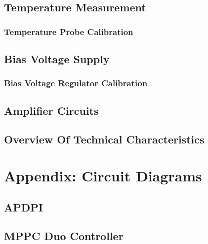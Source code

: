 \documentclass[a4paper, 12pt]{article}
\begin{document}
	\subsection{Temperature Measurement}
		\subsubsection{Temperature Probe Calibration}
	\subsection{Bias Voltage Supply}
		\subsubsection{Bias Voltage Regulator Calibration}
	\subsection{Amplifier Circuits}
	\subsection{Overview Of Technical Characteristics}

	\section{Appendix: Circuit Diagrams}
	\subsection{APDPI}
	\subsection{MPPC Duo Controller}
\end{document}
